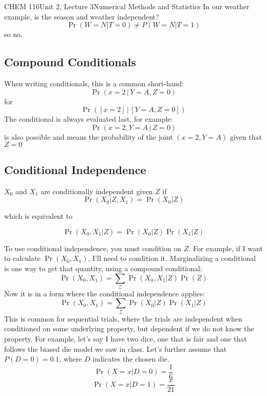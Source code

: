 \documentclass{article}
\begin{document}
\begin{tdoc}{CHEM 116}{Unit 2, Lecture 3}{Numerical Methods and Statistics}
\vspace{0.2cm}
In our weather example, is the season and weather independent?
\[
\Pr(W=N|T=0) \neq P(W=N|T=1)
\]
so no.


\subsection{Compound Conditionals}
When writing conditionals, this is a common short-hand:
\[
\Pr (x = 2\, | \,Y = A, Z = 0)
\]
for
\[
\Pr ([x = 2]\,|\, [Y = A, Z = 0])
\]
The conditional is always evaluated last, for example:
\[
\Pr(x = 2, Y = A\, | \,Z = 0)
\]
is also possible and means the probability of the joint $(x=2, Y=A)$
given that $Z = 0$



\subsection{Conditional Independence}
$X_0$ and $X_1$ are conditionally independent given $Z$ if
\begin{equation}
\Pr(X_0 | Z, X_1) = \Pr(X_0 | Z)
\end{equation}

which is equivalent to

\begin{equation}
\Pr(X_0, X_1 | Z) = \Pr(X_0 | Z)\Pr(X_1 | Z)
\end{equation}


To use conditional independence, you must condition on $Z$. For
example, if I want to calculate $\Pr(X_0, X_1)$, I'll need to
condition it. Marginalizing a conditional is one way to get that
quantity, using a compound conditional:
\[
\Pr(X_0, X_1) = \sum_\mathcal{Z}\Pr(X_0, X_1 | Z) \Pr(Z)
\]
Now it is in a form where the conditional independence applies:
\[
\Pr(X_0, X_1) = \sum_\mathcal{Z}\Pr(X_0 | Z) \Pr(X_1 | Z)
\]
This is common for sequential trials, where the trials are independent
when conditioned on some underlying property, but dependent if we do
not know the property. For example, let's say I have two dice, one
that is fair and one that follows the biased die model we saw in
class. Let's further assume that $P(D = 0) = 0.1$, where $D$ indicates
the chosen die.
\[
\Pr(X=x | D = 0) = \frac{1}{6}
\]
\[
\Pr(X=x | D = 1) = \frac{x}{21}
\]


\end{tdoc}
\end{document}
